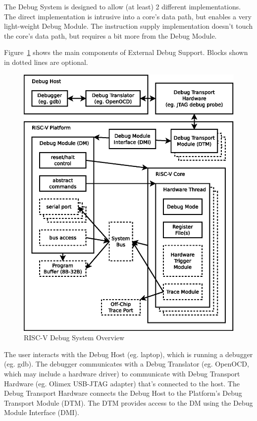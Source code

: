 \documentclass{article}
\begin{document}
The Debug System is designed to allow (at least) 2 different implementations.
The direct implementation is intrusive into a core's data path, but enables a
very light-weight Debug Module. The instruction supply implementation doesn't
touch the core's data path, but requires a bit more from the Debug Module.

Figure~\ref{fig:overview} shows the main components of External Debug Support.
Blocks shown in dotted lines are optional.

\begin{figure}
   \centering
   \includegraphics[width=\textwidth]{overview.eps}
   \caption{RISC-V Debug System Overview}
   \label{fig:overview}
\end{figure}

The user interacts with the Debug Host (eg. laptop), which is running a
debugger (eg. gdb).  The debugger communicates with a Debug Translator (eg.
OpenOCD, which may include a hardware driver) to communicate with Debug
Transport Hardware (eg.  Olimex USB-JTAG adapter) that's connected to the host.
The Debug Transport Hardware connects the Debug Host to the Platform's Debug
Transport Module (DTM).  The DTM provides access to the DM using the Debug
Module Interface (DMI).
\end{document}
